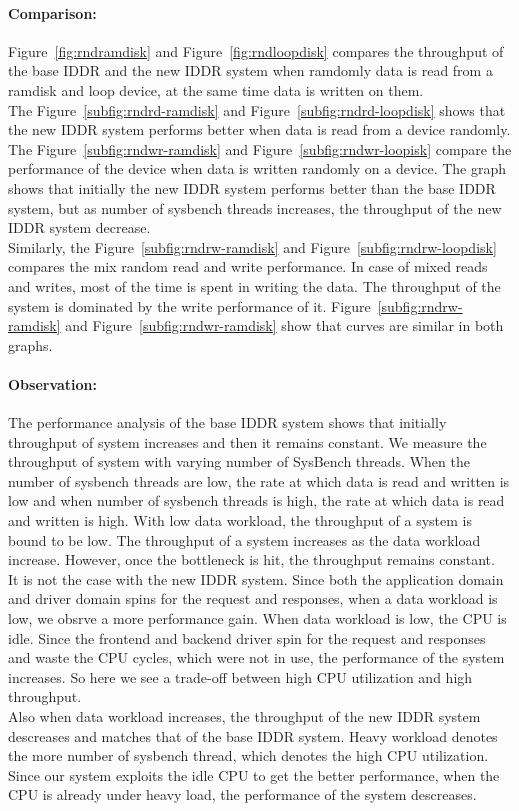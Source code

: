 \paragraph{Comparison:}

Figure~\ref{fig:rndramdisk} and Figure~\ref{fig:rndloopdisk} compares the throughput of the base IDDR and the new IDDR system when ramdomly data is read from a ramdisk and loop device, at the same time data is written on them.
\\[3mm]
The Figure~\ref{subfig:rndrd-ramdisk} and Figure~\ref{subfig:rndrd-loopdisk} shows that the new IDDR system performs better when data is read from a device randomly.  
\\[3mm]
The Figure~\ref{subfig:rndwr-ramdisk} and Figure~\ref{subfig:rndwr-loopisk} compare the performance of the device when data is written randomly on a device. The graph shows that initially the new IDDR system performs better than the base IDDR system, but as number of sysbench threads increases, the throughput of the new IDDR system decrease.
\\[3mm] 
Similarly, the Figure~\ref{subfig:rndrw-ramdisk} and Figure~\ref{subfig:rndrw-loopdisk} compares the mix random read and write performance. In case of mixed reads and writes, most of the time is spent in writing the data. The throughput of the system is dominated by the write performance of it. Figure~\ref{subfig:rndrw-ramdisk} and Figure~\ref{subfig:rndwr-ramdisk} show that curves are similar in both graphs. 

\paragraph{Observation:}
The performance analysis of the base IDDR system shows that initially throughput of system increases and then it remains constant. We measure the throughput of system with varying number of SysBench threads. When the number of sysbench threads are low, the rate at which data is read and written is low and when number of sysbench threads is high, the rate at which data is read and written is high. With low data workload, the throughput of a system is bound to be low. The throughput of a system increases as the data workload increase. However, once the bottleneck is hit, the throughput remains constant.
\\[3mm]
It is not the case with the new IDDR system. Since both the application domain and driver domain spins for the request and responses, when a data workload is low, we obsrve a more performance gain. When data workload is low, the CPU is idle. Since the frontend and backend driver spin for the request and responses and waste the CPU cycles, which were not in use, the performance of the system increases. So here we see a trade-off between high CPU utilization and high throughput. 
\\[3mm]
Also when data workload increases, the throughput of the new IDDR system descreases and matches that of the base IDDR system. Heavy workload denotes the more number of sysbench thread, which denotes the high CPU utilization. Since our system exploits the idle CPU to get the better performance, when the CPU is already under heavy load, the performance of the system descreases.

